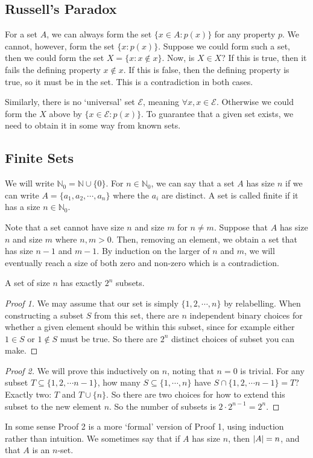 \documentclass{article}
\begin{document}
\subsection{Russell's Paradox}
For a set $A$, we can always form the set $\{ x \in A: p(x) \}$ for any property $p$. We cannot, however, form the set $\{ x: p(x) \}$. Suppose we could form such a set, then we could form the set $X = \{ x: x \notin x \}$. Now, is $X \in X$? If this is true, then it fails the defining property $x \notin x$. If this is false, then the defining property is true, so it must be in the set. This is a contradiction in both cases.

Similarly, there is no `universal' set $\mathscr E$, meaning $\forall x, x \in \mathscr E$. Otherwise we could form the $X$ above by $\{ x \in \mathscr E: p(x) \}$. To guarantee that a given set exists, we need to obtain it in some way from known sets.

\subsection{Finite Sets}
We will write $\mathbb N_0 = \mathbb N \cup \{ 0 \}$. For $n \in \mathbb N_0$, we can say that a set $A$ has size $n$ if we can write $A = \{ a_1, a_2, \cdots, a_n \}$ where the $a_i$ are distinct. A set is called finite if it has a size $n \in \mathbb N_0$.

Note that a set cannot have size $n$ and size $m$ for $n \neq m$. Suppose that $A$ has size $n$ and size $m$ where $n, m > 0$. Then, removing an element, we obtain a set that has size $n-1$ and $m-1$. By induction on the larger of $n$ and $m$, we will eventually reach a size of both zero and non-zero which is a contradiction.

\begin{proposition}
	A set of size $n$ has exactly $2^n$ subsets.
\end{proposition}
\begin{proof}[Proof 1]
	We may assume that our set is simply $\{ 1, 2, \cdots, n \}$ by relabelling. When constructing a subset $S$ from this set, there are $n$ independent binary choices for whether a given element should be within this subset, since for example either $1 \in S$ or $1 \notin S$ must be true. So there are $2^n$ distinct choices of subset you can make.
\end{proof}
\begin{proof}[Proof 2]
	We will prove this inductively on $n$, noting that $n=0$ is trivial. For any subset $T \subseteq \{ 1, 2, \cdots n-1 \}$, how many $S \subseteq \{ 1, \cdots, n \}$ have $S \cap \{ 1, 2, \cdots n-1 \} = T$? Exactly two: $T$ and $T \cup \{ n \}$. So there are two choices for how to extend this subset to the new element $n$. So the number of subsets is $2 \cdot 2^{n-1} = 2^n$.
\end{proof}
\noindent In some sense Proof 2 is a more `formal' version of Proof 1, using induction rather than intuition. We sometimes say that if $A$ has size $n$, then $\abs{A} = n$, and that $A$ is an $n$-set.
\end{document}
